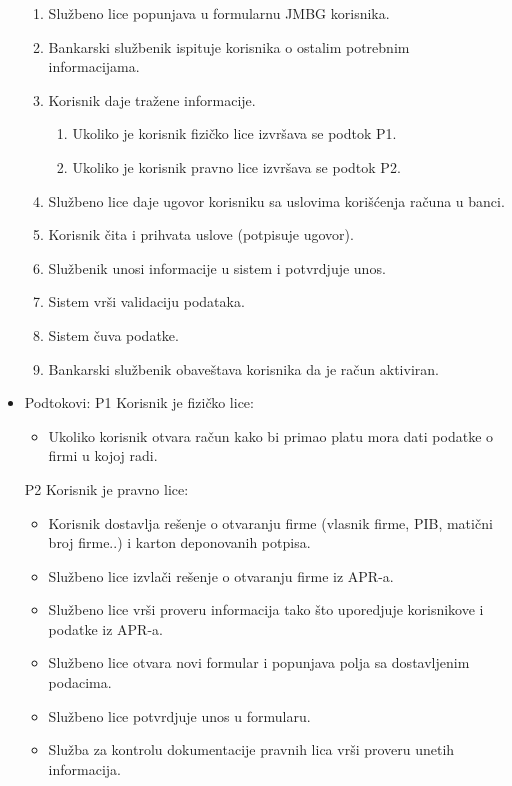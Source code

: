 \documentclass{article}
\begin{document}
\begin{itemize}
\begin{enumerate}
            \item Službeno lice popunjava u formularnu JMBG korisnika.
            \item Bankarski službenik ispituje korisnika o ostalim potrebnim informacijama.
            \item Korisnik daje tražene informacije.
            \begin{enumerate}
                \item Ukoliko je korisnik fizičko lice izvršava se podtok P1.
                \item Ukoliko je korisnik pravno lice izvršava se podtok P2.
            \end{enumerate}
            \item Službeno lice daje ugovor korisniku sa uslovima korišćenja računa u banci.
            \item Korisnik čita i prihvata uslove (potpisuje ugovor).
            \item Službenik unosi informacije u sistem i potvrdjuje unos.
            \item Sistem vrši validaciju podataka.
            \item Sistem čuva podatke.
            \item Bankarski službenik obaveštava korisnika da je račun aktiviran.
        \end{enumerate}
    \item Podtokovi:
        P1 Korisnik je fizičko lice:
        \begin{itemize}
            \item Ukoliko korisnik otvara račun kako bi primao platu mora dati podatke o firmi u kojoj radi.
        \end{itemize}   
        P2 Korisnik je pravno lice:
        \begin{itemize}
            \item Korisnik dostavlja rešenje o otvaranju firme (vlasnik firme, PIB, matični broj firme..) i karton deponovanih potpisa.
            \item Službeno lice izvlači rešenje o otvaranju firme iz APR-a.
            \item Službeno lice vrši proveru informacija tako što uporedjuje korisnikove i podatke iz APR-a.
            \item Službeno lice otvara novi formular i popunjava polja sa dostavljenim podacima.
            \item Službeno lice potvrdjuje unos u formularu.
            \item Služba za kontrolu dokumentacije pravnih lica vrši proveru unetih informacija.

\end{itemize}
\end{itemize}
\end{document}
